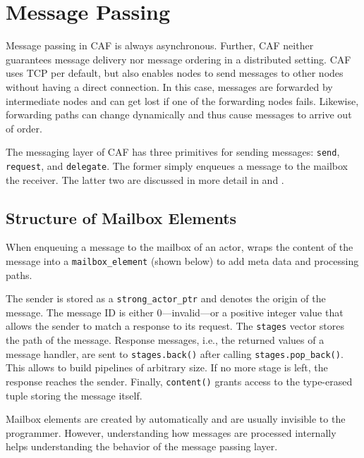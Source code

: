 \section{Message Passing}
\label{message-passing}

Message passing in CAF is always asynchronous. Further, CAF neither guarantees message delivery nor message ordering in a distributed setting. CAF uses TCP per default, but also enables nodes to send messages to other nodes without having a direct connection.  In this case, messages are forwarded by intermediate nodes and can get lost if one of the forwarding nodes fails. Likewise, forwarding paths can change dynamically and thus cause messages to arrive out of order.

The messaging layer of CAF has three primitives for sending messages: \lstinline^send^, \lstinline^request^, and \lstinline^delegate^. The former simply enqueues a message to the mailbox the receiver. The latter two are discussed in more detail in  and .

\subsection{Structure of Mailbox Elements}
\label{mailbox-element}

When enqueuing a message to the mailbox of an actor, \lib wraps the content of the message into a \lstinline^mailbox_element^ (shown below) to add meta data and processing paths.


The sender is stored as a \lstinline^strong_actor_ptr^  and denotes the origin of the message. The message ID is either 0---invalid---or a positive integer value that allows the sender to match a response to its request. The \lstinline^stages^ vector stores the path of the message. Response messages, i.e., the returned values of a message handler, are sent to \lstinline^stages.back()^ after calling \lstinline^stages.pop_back()^. This allows \lib to build pipelines of arbitrary size. If no more stage is left, the response reaches the sender. Finally, \lstinline^content()^ grants access to the type-erased tuple storing the message itself.

Mailbox elements are created by \lib automatically and are usually invisible to the programmer. However, understanding how messages are processed internally helps understanding the behavior of the message passing layer.

